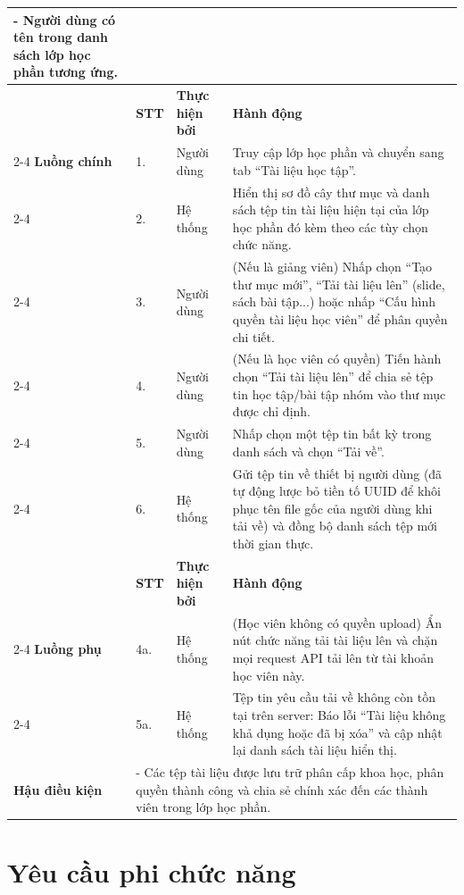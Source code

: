 \documentclass[../DoAn.tex]{subfiles}
\begin{document}
\begin{longtable}{|p{2.8cm}|p{0.8cm}|p{2.2cm}|p{7.5cm}|}
{      - Người dùng có tên trong danh sách lớp học phần tương ứng.} \\ \hline
     & \textbf{STT} & \textbf{Thực hiện bởi} & \textbf{Hành động} \\ \cline{2-4}
    \textbf{Luồng chính} & 1. & Người dùng & Truy cập lớp học phần và chuyển sang tab ``Tài liệu học tập''. \\ \cline{2-4}
     & 2. & Hệ thống & Hiển thị sơ đồ cây thư mục và danh sách tệp tin tài liệu hiện tại của lớp học phần đó kèm theo các tùy chọn chức năng. \\ \cline{2-4}
     & 3. & Người dùng & (Nếu là giảng viên) Nhấp chọn ``Tạo thư mục mới'', ``Tải tài liệu lên'' (slide, sách bài tập...) hoặc nhấp ``Cấu hình quyền tài liệu học viên'' để phân quyền chi tiết. \\ \cline{2-4}
     & 4. & Người dùng & (Nếu là học viên có quyền) Tiến hành chọn ``Tải tài liệu lên'' để chia sẻ tệp tin học tập/bài tập nhóm vào thư mục được chỉ định. \\ \cline{2-4}
     & 5. & Người dùng & Nhấp chọn một tệp tin bất kỳ trong danh sách và chọn ``Tải về''. \\ \cline{2-4}
     & 6. & Hệ thống & Gửi tệp tin về thiết bị người dùng (đã tự động lược bỏ tiền tố UUID để khôi phục tên file gốc của người dùng khi tải về) và đồng bộ danh sách tệp mới thời gian thực. \\ \hline
     & \textbf{STT} & \textbf{Thực hiện bởi} & \textbf{Hành động} \\ \cline{2-4}
    \textbf{Luồng phụ} & 4a. & Hệ thống & (Học viên không có quyền upload) Ẩn nút chức năng tải tài liệu lên và chặn mọi request API tải lên từ tài khoản học viên này. \\ \cline{2-4}
     & 5a. & Hệ thống & Tệp tin yêu cầu tải về không còn tồn tại trên server: Báo lỗi ``Tài liệu không khả dụng hoặc đã bị xóa'' và cập nhật lại danh sách tài liệu hiển thị. \\ \hline
    \textbf{Hậu điều kiện} & \multicolumn{3}{p{10.9cm}|}{- Các tệp tài liệu được lưu trữ phân cấp khoa học, phân quyền thành công và chia sẻ chính xác đến các thành viên trong lớp học phần.} \\ \hline
\end{longtable}

\section{Yêu cầu phi chức năng}

\label{section:2.4}
\end{document}
